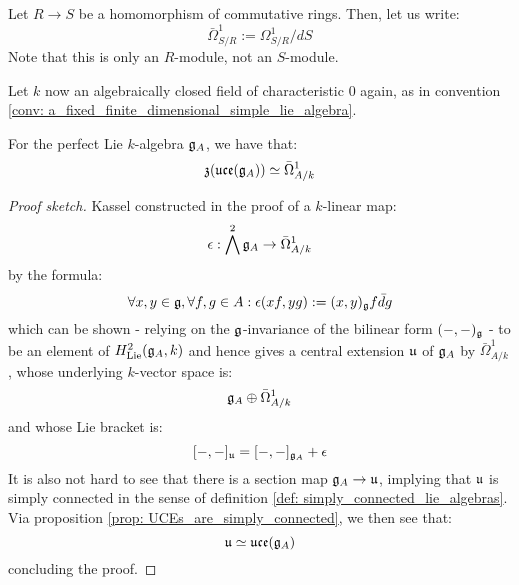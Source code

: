         \begin{convention}
            Let $R \to S$ be a homomorphism of commutative rings. Then, let us write:
                $$\bar{\Omega}^1_{S/R} := \Omega^1_{S/R}/dS$$
            Note that this is only an $R$-module, not an $S$-module.
        \end{convention}
        
        \begin{theorem} \label{theorem: kassel_realisation}
            \cite[Corollary 3.5]{kassel_universal_central_extensions_of_lie_algebras} Let $k$ now an algebraically closed field of characteristic $0$ again, as in convention \ref{conv: a_fixed_finite_dimensional_simple_lie_algebra}. 

            For the perfect Lie $k$-algebra $\mathfrak{g}_A$, we have that:
                $$\mathfrak{z}(\mathfrak{uce}(\mathfrak{g}_A)) \simeq \bar{\Omega}^1_{A/k}$$
        \end{theorem}
            \begin{proof}[Proof sketch]
                Kassel constructed in the proof of \cite[Theorem 3.3]{kassel_universal_central_extensions_of_lie_algebras} a $k$-linear map:
                    $$\epsilon: \bigwedge^2 \mathfrak{g}_A \to \bar{\Omega}^1_{A/k}$$
                by the formula:
                    $$\forall x, y \in \mathfrak{g}, \forall f, g \in A: \epsilon(x f, y g) := (x, y)_{\mathfrak{g}} f \bar{d}g$$
                which can be shown - relying on the $\mathfrak{g}$-invariance of the bilinear form $(-, -)_{\mathfrak{g}}$ - to be an element of $H^2_{\mathrm{Lie}}(\mathfrak{g}_A, k)$ and hence gives a central extension $\mathfrak{u}$ of $\mathfrak{g}_A$ by $\bar{\Omega}_{A/k}^1$, whose underlying $k$-vector space is:
                    $$\mathfrak{g}_A \oplus \bar{\Omega}_{A/k}^1$$
                and whose Lie bracket is:
                    $$[-, -]_{\mathfrak{u}} = [-, -]_{\mathfrak{g}_A} + \epsilon$$
                It is also not hard to see that there is a section map $\mathfrak{g}_A \to \mathfrak{u}$, implying that $\mathfrak{u}$ is simply connected in the sense of definition \ref{def: simply_connected_lie_algebras}. Via proposition \ref{prop: UCEs_are_simply_connected}, we then see that:
                    $$\mathfrak{u} \simeq \mathfrak{uce}(\mathfrak{g}_A)$$
                concluding the proof.
            \end{proof}
